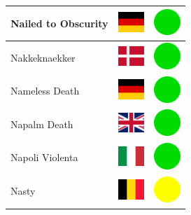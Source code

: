 \documentclass[12pt, a4paper, twoside]{report}
\begin{document}
\begin{center}
\begin{longtable}{|p{5cm}|p{2cm}|p{2cm}|}
 Nailed to Obscurity                                        & \includegraphics[width=1cm]{../img/flags/de} &   \includegraphics[width=1cm]{../likes/y} \\ \hline
 Nakkeknaekker                                              & \includegraphics[width=1cm]{../img/flags/dk} &   \includegraphics[width=1cm]{../likes/y} \\ \hline
 Nameless Death                                             & \includegraphics[width=1cm]{../img/flags/de} &   \includegraphics[width=1cm]{../likes/y} \\ \hline
 Napalm Death                                               & \includegraphics[width=1cm]{../img/flags/gb} &   \includegraphics[width=1cm]{../likes/y} \\ \hline
 Napoli Violenta                                            & \includegraphics[width=1cm]{../img/flags/it} &   \includegraphics[width=1cm]{../likes/y} \\ \hline
 Nasty                                                      & \includegraphics[width=1cm]{../img/flags/be} &   \includegraphics[width=1cm]{../likes/m} \\ \hline

\end{longtable}
\end{center}
\end{document}

